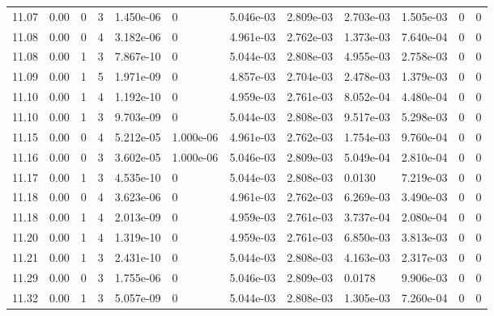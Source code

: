 \documentclass[preview]{standalone}
\begin{document}
{{{{{{{{{{{{{{\begin{tabular}{L{1.2cm}C{1.2cm} C{0.3cm}C{0.5cm} C{1.4cm}C{1.4cm} C{1.4cm}C{1.4cm} C{1.6cm}C{1.6cm} C{1.6cm}C{1.6cm}}
  11.07  &  0.00  & 0     &  3 &  1.450e-06  & 0  &  5.046e-03&   2.809e-03& 2.703e-03 & 1.505e-03   &  0 & 0  \\ 
  11.08  &  0.00  & 0     &  4 &  3.182e-06  & 0  &  4.961e-03&   2.762e-03& 1.373e-03 & 7.640e-04   &  0 & 0  \\ 
  11.08  &  0.00  & 1     &  3 &  7.867e-10  & 0  &  5.044e-03&   2.808e-03& 4.955e-03 & 2.758e-03   &  0 & 0  \\ 
  11.09  &  0.00  & 1     &  5 &  1.971e-09  & 0  &  4.857e-03&   2.704e-03& 2.478e-03 & 1.379e-03   &  0 & 0  \\ 
  11.10  &  0.00  & 1     &  4 &  1.192e-10  & 0  &  4.959e-03&   2.761e-03& 8.052e-04 & 4.480e-04   &  0 & 0  \\ 
  11.10  &  0.00  & 1     &  3 &  9.703e-09  & 0  &  5.044e-03&   2.808e-03& 9.517e-03 & 5.298e-03   &  0 & 0  \\ 
  11.15  &  0.00  & 0     &  4 &  5.212e-05  & 1.000e-06  &  4.961e-03&   2.762e-03& 1.754e-03 & 9.760e-04   &  0 & 0  \\ 
  11.16  &  0.00  & 0     &  3 &  3.602e-05  & 1.000e-06  &  5.046e-03&   2.809e-03& 5.049e-04 & 2.810e-04   &  0 & 0  \\ 
  11.17  &  0.00  & 1     &  3 &  4.535e-10  & 0  &  5.044e-03&   2.808e-03& 0.0130 & 7.219e-03   &  0 & 0  \\ 
  11.18  &  0.00  & 0     &  4 &  3.623e-06  & 0  &  4.961e-03&   2.762e-03& 6.269e-03 & 3.490e-03   &  0 & 0  \\ 
  11.18  &  0.00  & 1     &  4 &  2.013e-09  & 0  &  4.959e-03&   2.761e-03& 3.737e-04 & 2.080e-04   &  0 & 0  \\ 
  11.20  &  0.00  & 1     &  4 &  1.319e-10  & 0  &  4.959e-03&   2.761e-03& 6.850e-03 & 3.813e-03   &  0 & 0  \\ 
  11.21  &  0.00  & 1     &  3 &  2.431e-10  & 0  &  5.044e-03&   2.808e-03& 4.163e-03 & 2.317e-03   &  0 & 0  \\ 
  11.29  &  0.00  & 0     &  3 &  1.755e-06  & 0  &  5.046e-03&   2.809e-03& 0.0178 & 9.906e-03   &  0 & 0  \\ 
  11.32  &  0.00  & 1     &  3 &  5.057e-09  & 0  &  5.044e-03&   2.808e-03& 1.305e-03 & 7.260e-04   &  0 & 0  \\ 
\hline 
\end{tabular} 

}}}}}}}}}}}}}}
\end{document}

